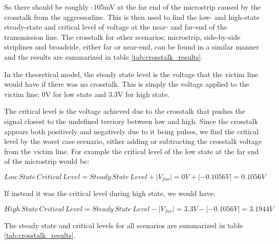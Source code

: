 \documentclass[../main.tex]{subfiles}
\begin{document}
So there should be roughly -105mV at the far end of the microstrip caused by the crosstalk from the aggressorline. This is then used to find the low- and high-state steady-state and critical level of voltage at the near- and far-end of the transmission line. The crosstalk for other scenarios; microstrip, side-by-side striplines and broadside, either far or near-end, can be found in a similar manner and the results are summarized in table \ref{tab:crosstalk_results}. 


In the theoretical model, the steady state level is the voltage that the victim line would have if there was no crosstalk. This is simply the voltage applied to the victim line; 0V for low state and 3.3V for high state.


The critical level is the voltage achieved due to the crosstalk that pushes the signal closest to the undefined terriory between low and high. Since the crosstalk appears both positively and negatively due to it being pulses, we find the critical level by the worst case scenario, either adding or subtracting the crosstalk voltage from the victim line. For example the critical level of the low state at the far end of the microstrip would be:

\begin{equation}
    Low\,State\,Critical\,Level = Steady\,State\,Level + |V_{far}| = 0 V + |-0.1056 V| = 0.1056 V
\end{equation}

If instead it was the critical level during high state, we would have:

\begin{equation}
    High\,State\,Critical\,Level = Steady\,State\,Level - |V_{far}| = 3.3 V - |-0.1056 V| = 3.1944 V
\end{equation}

The steady state and critical levels for all scenarios are summarized in table \ref{tab:crosstalk_results}.
\end{document}
